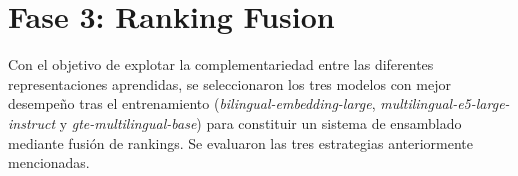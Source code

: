 \begin{table}[!ht]
    \centering
    \caption{Resultados comparativos tras el entrenamiento de los 10 mejores modelos.}
    \label{tab:finetuned_results}
\end{table}

\section{Fase 3: Ranking Fusion}

\noindent Con el objetivo de explotar la complementariedad entre las diferentes representaciones aprendidas, se seleccionaron los tres modelos con mejor desempeño tras el entrenamiento (\textit{bilingual-embedding-large}, \textit{multilingual-e5-large-instruct} y \textit{gte-multilingual-base}) para constituir un sistema de ensamblado mediante fusión de rankings. Se evaluaron las tres estrategias anteriormente mencionadas.

